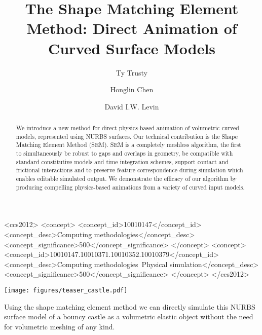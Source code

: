 \documentclass[acmtog, anonymous=false, review=false, balance=false]{acmart}
\begin{document}
\title{The Shape Matching Element Method: Direct Animation of Curved Surface Models}

\author{Ty Trusty}

%
\author{Honglin Chen}

%
%
\author{David I.W. Levin}


\begin{CCSXML}
<ccs2012>
   <concept>
       <concept_id>10010147</concept_id>
       <concept_desc>Computing methodologies</concept_desc>
       <concept_significance>500</concept_significance>
       </concept>
   <concept>
       <concept_id>10010147.10010371.10010352.10010379</concept_id>
       <concept_desc>Computing methodologies~Physical simulation</concept_desc>
       <concept_significance>500</concept_significance>
       </concept>
 </ccs2012>
\end{CCSXML}


%
%




\begin{teaserfigure}
  \texttt{[image: figures/teaser\_castle.pdf]}
  \caption{Using the shape matching element method we can directly simulate this NURBS surface model of a bouncy castle as a volumetric elastic object without the need for volumetric meshing of any kind.}
  \label{fig:teaser}
\end{teaserfigure}

\begin{abstract}
We introduce a new method for direct physics-based animation of volumetric curved models, represented using NURBS surfaces.  
Our technical contribution is the Shape Matching Element Method (SEM).
SEM is a completely meshless algorithm, the first to simultaneously 
be robust to gaps and overlaps in geometry, 
be compatible with standard constitutive models and time integration schemes, support contact and frictional interactions  
and to preserve feature correspondence during simulation which enables editable simulated output. 
We demonstrate the efficacy of our algorithm by producing compelling physics-based animations from a variety of curved input models.
\end{abstract}
\end{document}
